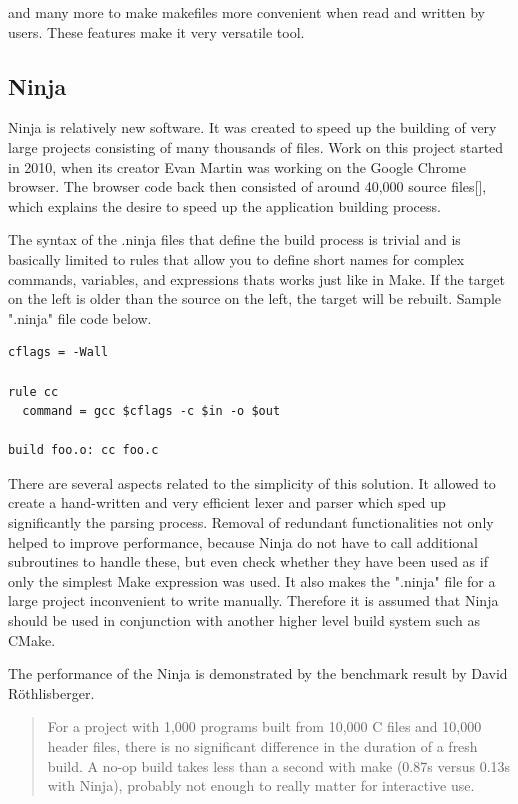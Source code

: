 and many more to make makefiles more convenient when read and written by
users. These features make it very versatile tool.

\hypertarget{ninja}{%
\subsection{Ninja}\label{ninja}}

Ninja is relatively new software. It was created to speed up the
building of very large projects consisting of many thousands of files.
Work on this project started in 2010, when its creator Evan Martin was
working on the Google Chrome browser. The browser code back then
consisted of around 40,000 source files[\cite{NINJACHROME}], which explains the desire to
speed up the application building process.

The syntax of the .ninja files that define the build process is trivial
and is basically limited to rules that allow you to define short names
for complex commands, variables, and expressions thats works just like
in Make. If the target on the left is older than the source on the left,
the target will be rebuilt. Sample ".ninja" file code below.

\begin{lstlisting}[frame=single, caption={%
  Example of simple .ninja file \cite{NINJAFILE}%
}]
cflags = -Wall

rule cc
  command = gcc $cflags -c $in -o $out

build foo.o: cc foo.c
\end{lstlisting}

There are several aspects related to the simplicity of this solution. It
allowed to create a hand-written and very efficient lexer and parser
which sped up significantly the parsing process. Removal of redundant
functionalities not only helped to improve performance, because Ninja do
not have to call additional subroutines to handle these, but even check
whether they have been used as if only the simplest Make expression was
used. It also makes the ".ninja" file for a large project inconvenient to
write manually. Therefore it is assumed that Ninja should be used in
conjunction with another higher level build system such as CMake.

The performance of the Ninja is demonstrated by the benchmark result by
David Röthlisberger\cite{BENCHMARK}.

\begin{quote}
For a project with 1,000 programs built from 10,000 C files and 10,000
header files, there is no significant difference in the duration of a
fresh build. A no-op build takes less than a second with make (0.87s
versus 0.13s with Ninja), probably not enough to really matter for
interactive use.
\end{quote}

